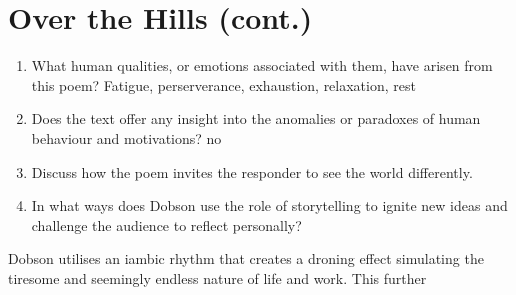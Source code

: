 \section{Over the Hills (cont.)} \label{7/11/2024}
	\begin{enumerate}
		\item What human qualities, or emotions associated with them, have arisen from this poem?
			\subitem Fatigue, perserverance, exhaustion, relaxation, rest
		\item Does the text offer any insight into the anomalies or paradoxes of human behaviour and motivations?
			\subitem no
		\item Discuss how the poem invites the responder to see the world differently.
			\subitem
		\item In what ways does Dobson use the role of storytelling to ignite new ideas and challenge the audience to reflect personally?
	\end{enumerate}

	Dobson utilises an iambic rhythm that creates a droning effect simulating the tiresome and seemingly endless nature of life and work. This further